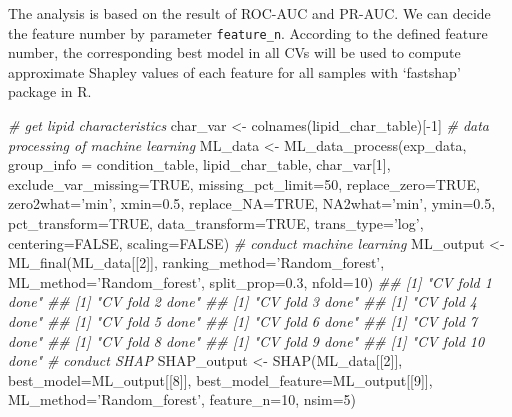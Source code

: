 \documentclass[]{article}
\newcommand{\hlnum}[1]{\textcolor[rgb]{0.816,0.125,0.439}{#1}}%
\newcommand{\hlstr}[1]{\textcolor[rgb]{0.251,0.627,0.251}{#1}}%
\newcommand{\hlcom}[1]{\textcolor[rgb]{0.502,0.502,0.502}{\textit{#1}}}%
\newcommand{\hlopt}[1]{\textcolor[rgb]{0,0,0}{#1}}%
\newcommand{\hlstd}[1]{\textcolor[rgb]{0.251,0.251,0.251}{#1}}%
\newcommand{\hlkwc}[1]{\textcolor[rgb]{0.251,0.251,0.251}{#1}}%
\newcommand{\hlkwd}[1]{\textcolor[rgb]{0.878,0.439,0.125}{#1}}%
\newenvironment{Shaded}{\begin{myshaded}}{\end{myshaded}}
\newcommand{\KeywordTok}[1]{\hlkwd{#1}}
\newcommand{\DataTypeTok}[1]{\hlkwc{#1}}
\newcommand{\DecValTok}[1]{\hlnum{#1}}
\newcommand{\FloatTok}[1]{\hlnum{#1}}
\newcommand{\StringTok}[1]{\hlstr{#1}}
\newcommand{\CommentTok}[1]{\hlcom{#1}}
\newcommand{\OtherTok}[1]{{#1}}
\newcommand{\OperatorTok}[1]{\hlopt{#1}}
\newcommand{\NormalTok}[1]{\hlstd{#1}}
\begin{document}
The analysis is based on the result of ROC-AUC and PR-AUC. We can decide the feature number by parameter \texttt{feature\_n}. According to the defined feature number, the corresponding best model in all CVs will be used to compute approximate Shapley values of each feature for all samples with `fastshap' package in R.

\begin{Shaded}
\begin{Highlighting}[]
\CommentTok{# get lipid characteristics}
\NormalTok{char_var <-}\StringTok{ }\KeywordTok{colnames}\NormalTok{(lipid_char_table)[}\OperatorTok{-}\DecValTok{1}\NormalTok{]}
\CommentTok{# data processing of machine learning}
\NormalTok{ML_data <-}\StringTok{ }\KeywordTok{ML_data_process}\NormalTok{(exp_data, }\DataTypeTok{group_info =}\NormalTok{ condition_table,}
\NormalTok{                           lipid_char_table, char_var[}\DecValTok{1}\NormalTok{],}
                           \DataTypeTok{exclude_var_missing=}\OtherTok{TRUE}\NormalTok{, }\DataTypeTok{missing_pct_limit=}\DecValTok{50}\NormalTok{,}
                           \DataTypeTok{replace_zero=}\OtherTok{TRUE}\NormalTok{, }\DataTypeTok{zero2what=}\StringTok{'min'}\NormalTok{, }\DataTypeTok{xmin=}\FloatTok{0.5}\NormalTok{,}
                           \DataTypeTok{replace_NA=}\OtherTok{TRUE}\NormalTok{, }\DataTypeTok{NA2what=}\StringTok{'min'}\NormalTok{, }\DataTypeTok{ymin=}\FloatTok{0.5}\NormalTok{,}
                           \DataTypeTok{pct_transform=}\OtherTok{TRUE}\NormalTok{, }\DataTypeTok{data_transform=}\OtherTok{TRUE}\NormalTok{,}
                           \DataTypeTok{trans_type=}\StringTok{'log'}\NormalTok{, }\DataTypeTok{centering=}\OtherTok{FALSE}\NormalTok{, }\DataTypeTok{scaling=}\OtherTok{FALSE}\NormalTok{)}
\CommentTok{# conduct machine learning}
\NormalTok{ML_output <-}\StringTok{ }\KeywordTok{ML_final}\NormalTok{(ML_data[[}\DecValTok{2}\NormalTok{]], }\DataTypeTok{ranking_method=}\StringTok{'Random_forest'}\NormalTok{,}
                      \DataTypeTok{ML_method=}\StringTok{'Random_forest'}\NormalTok{, }\DataTypeTok{split_prop=}\FloatTok{0.3}\NormalTok{, }\DataTypeTok{nfold=}\DecValTok{10}\NormalTok{)}
\CommentTok{## [1] "CV fold 1 done"}
\CommentTok{## [1] "CV fold 2 done"}
\CommentTok{## [1] "CV fold 3 done"}
\CommentTok{## [1] "CV fold 4 done"}
\CommentTok{## [1] "CV fold 5 done"}
\CommentTok{## [1] "CV fold 6 done"}
\CommentTok{## [1] "CV fold 7 done"}
\CommentTok{## [1] "CV fold 8 done"}
\CommentTok{## [1] "CV fold 9 done"}
\CommentTok{## [1] "CV fold 10 done"}
\CommentTok{# conduct SHAP}
\NormalTok{SHAP_output <-}\StringTok{ }\KeywordTok{SHAP}\NormalTok{(ML_data[[}\DecValTok{2}\NormalTok{]], }\DataTypeTok{best_model=}\NormalTok{ML_output[[}\DecValTok{8}\NormalTok{]],}
                    \DataTypeTok{best_model_feature=}\NormalTok{ML_output[[}\DecValTok{9}\NormalTok{]],}
                    \DataTypeTok{ML_method=}\StringTok{'Random_forest'}\NormalTok{, }\DataTypeTok{feature_n=}\DecValTok{10}\NormalTok{, }\DataTypeTok{nsim=}\DecValTok{5}\NormalTok{)}
\end{Highlighting}
\end{Shaded}
\end{document}
